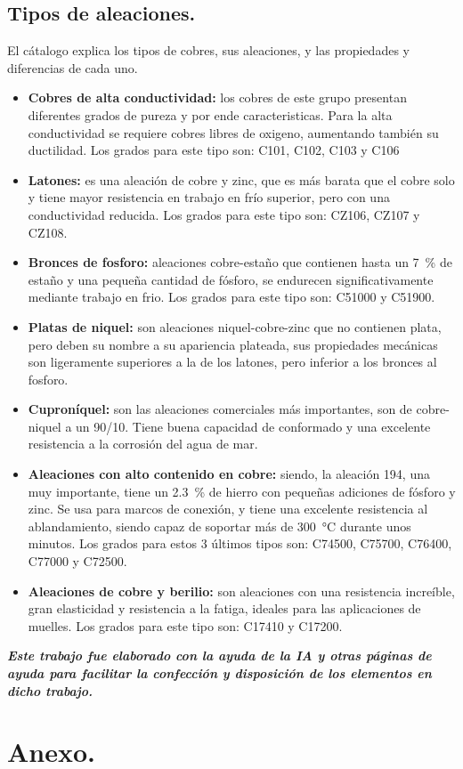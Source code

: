 \documentclass[12pt,a4paper]{article}
\begin{document}
\subsection{Tipos de aleaciones.}

El cátalogo explica los tipos de cobres, sus aleaciones, y las propiedades y diferencias de cada uno.

\begin{itemize}
   \item \textbf{Cobres de alta conductividad:} los cobres de este grupo presentan diferentes grados de pureza y por ende caracteristicas. Para la alta conductividad se requiere cobres libres de oxigeno, aumentando también su ductilidad. Los grados para este tipo son: C101, C102, C103 y C106
   \item \textbf{Latones:} es una aleación de cobre y zinc, que es más barata que el cobre solo y tiene mayor resistencia en trabajo en frío superior, pero con una conductividad reducida. Los grados para este tipo son: CZ106, CZ107 y CZ108.
   \item \textbf{Bronces de fosforo:} aleaciones cobre-estaño que contienen hasta un \SI{7}{\percent} de estaño y una pequeña cantidad de fósforo, se endurecen significativamente mediante trabajo en frio. Los grados para este tipo son: C51000 y C51900.
   \item \textbf{Platas de niquel:} son aleaciones niquel-cobre-zinc que no contienen plata, pero deben su nombre a su apariencia plateada, sus propiedades mecánicas son ligeramente superiores a la de los latones, pero inferior a los bronces al fosforo.
   \item \textbf{Cuproníquel:} son las aleaciones comerciales más importantes, son de cobre-niquel a un 90/10. Tiene buena capacidad de conformado y una excelente resistencia a la corrosión del agua de mar.
   \item \textbf{Aleaciones con alto contenido en cobre:} siendo, la aleación 194, una muy importante, tiene un \SI{2,3}{\percent} de hierro con pequeñas adiciones de fósforo y zinc. Se usa para marcos de conexión, y tiene una excelente resistencia al ablandamiento, siendo capaz de soportar más de \SI{300}{\celsius} durante unos minutos. Los grados para estos 3 últimos tipos son: C74500, C75700, C76400, C77000 y C72500.
   \item \textbf{Aleaciones de cobre y berilio:} son aleaciones con una resistencia increíble, gran elasticidad y resistencia a la fatiga, ideales para las aplicaciones de muelles. Los grados para este tipo son: C17410 y C17200.
\end{itemize}

\vfill
\textit{\textbf{Este trabajo fue elaborado con la ayuda de la IA y otras páginas de ayuda para facilitar la confección y disposición de los elementos en dicho trabajo.}}

\appendix
\section{Anexo.}\label{anexo}


\end{document}
